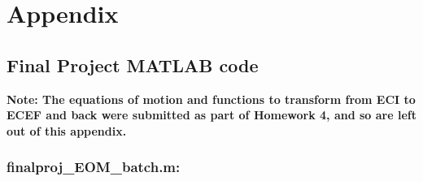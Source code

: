 \documentclass[conf]{new-aiaa}
\begin{document}
\newpage
\section*{Appendix} 

\subsection*{Final Project MATLAB code} 

\textbf{Note: The equations of motion and functions to transform from ECI to ECEF and back were submitted as part of Homework 4, and so are left out of this appendix.}

\subsubsection{finalproj\_EOM\_batch.m:}
\end{document}
